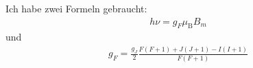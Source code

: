 Ich habe zwei Formeln gebraucht:
\begin{align}\label{eq:Resonanz}
	h\nu = g_F\mu_\text{B}B_m
\end{align}
und
\begin{align}\label{eq:LandeF}
	g_F = \frac{g_J}{2}\frac{F(F+1) + J(J+1) - I(I+1)}{F(F+1)}
\end{align}